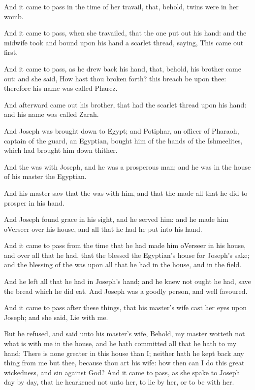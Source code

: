 \Verse And it came to pass in the time of her travail, that, behold, twins were in her womb.

\Verse And it came to pass, when she travailed, that the one put out his hand: and the midwife took and bound upon his hand a scarlet thread, saying, This came out first.

\Verse And it came to pass, as he drew back his hand, that, behold, his brother came out: and she said, How hast thou broken forth? this breach be upon thee: therefore his name was called Pharez.

\Verse And afterward came out his brother, that had the scarlet thread upon his hand: and his name was called Zarah.

\Chapter
\Verse And Joseph was brought down to Egypt; and Potiphar, an officer of Pharaoh, captain of the guard, an Egyptian, bought him of the hands of the Ishmeelites, which had brought him down thither.

\Verse And the \LORD was with Joseph, and he was a prosperous man; and he was in the house of his master the Egyptian.

\Verse And his master saw that the \LORD was with him, and that the \LORD made all that he did to prosper in his hand.

\Verse And Joseph found grace in his sight, and he served him: and he made him oVerseer over his house, and all that he had he put into his hand.

\Verse And it came to pass from the time that he had made him oVerseer in his house, and over all that he had, that the \LORD blessed the Egyptian's house for Joseph's sake; and the blessing of the \LORD was upon all that he had in the house, and in the field.

\Verse And he left all that he had in Joseph's hand; and he knew not ought he had, save the bread which he did eat. And Joseph was a goodly person, and well favoured.

\Verse And it came to pass after these things, that his master's wife cast her eyes upon Joseph; and she said, Lie with me.

\Verse But he refused, and said unto his master's wife, Behold, my master wotteth not what is with me in the house, and he hath committed all that he hath to my hand; \Verse There is none greater in this house than I; neither hath he kept back any thing from me but thee, because thou art his wife: how then can I do this great wickedness, and sin against God?  \Verse And it came to pass, as she spake to Joseph day by day, that he hearkened not unto her, to lie by her, or to be with her.

